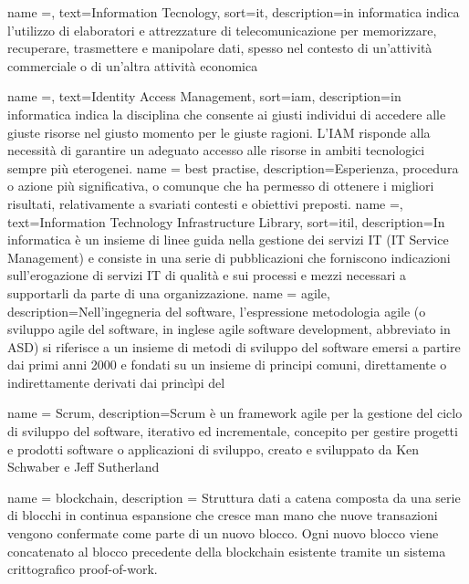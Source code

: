 {
    name =,
    text=Information Tecnology,
    sort=it,
    description={in informatica indica l'utilizzo di elaboratori e attrezzature di telecomunicazione per memorizzare, recuperare, trasmettere e manipolare dati, spesso nel contesto di un'attività commerciale o di un'altra attività economica}
}

{
    name =,
    text=Identity Access Management,
    sort=iam,
    description={in informatica indica la disciplina che consente ai giusti individui di accedere alle giuste risorse nel giusto
    momento per le giuste ragioni. L’IAM risponde alla necessità di garantire un
    adeguato accesso alle risorse in ambiti tecnologici sempre più eterogenei.}
}
{
    name = best practise,
    description={Esperienza, procedura o azione più significativa, o comunque che ha permesso di
    ottenere i migliori risultati, relativamente a svariati contesti e obiettivi preposti.}
}
{
    name =,
    text=Information
    Technology Infrastructure Library,
    sort=itil,
    description={In informatica è un insieme di linee guida nella gestione dei servizi IT (IT Service Management) e consiste in una serie di pubblicazioni che forniscono indicazioni sull'erogazione di servizi IT di qualità e sui processi e mezzi necessari a supportarli da parte di una organizzazione.}
}
{
    name = agile,
    description={Nell'ingegneria del software, l'espressione metodologia agile (o sviluppo agile del software, in inglese agile software development, abbreviato in ASD) si riferisce a un insieme di metodi di sviluppo del software emersi a partire dai primi anni 2000 e fondati su un insieme di principi comuni, direttamente o indirettamente derivati dai princìpi del \citep{site:agile-manifesto}}
}

{
    name = Scrum,
    description={Scrum è un framework agile per la gestione del ciclo di sviluppo del software, iterativo ed incrementale, concepito per gestire progetti e prodotti software o applicazioni di sviluppo, creato e sviluppato da Ken Schwaber e Jeff Sutherland}
}

{
	name = {blockchain},
	description = { Struttura dati a catena composta da una serie di blocchi in continua espansione che cresce man mano che nuove
			transazioni vengono confermate come parte di un nuovo blocco. Ogni nuovo blocco viene concatenato al blocco
			precedente della blockchain esistente tramite un sistema crittografico proof-of-work.
		}
}

